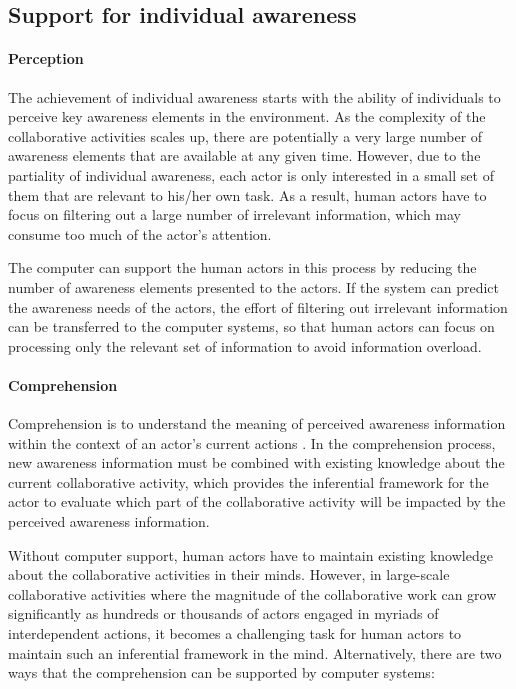 \subsection{Support for individual awareness} %
\label{sub:support_for_individual_awareness}
\paragraph*{Perception} %
\label{par:perception}
The achievement of individual awareness starts with the ability of individuals to perceive key awareness elements in the environment. As the complexity of the collaborative activities scales up, there are potentially a very large number of awareness elements that are available at any given time. However, due to the partiality of individual awareness, each actor is only interested in a small set of them that are relevant to his/her own task. As a result, human actors have to focus on filtering out a large number of irrelevant information, which may consume too much of the actor's attention. 

The computer can support the human actors in this process by reducing the number of awareness elements presented to the actors. If the system can predict the awareness needs of the actors, the effort of filtering out irrelevant information can be transferred to the computer systems, so that human actors can focus on processing only the relevant set of information to avoid information overload.

\paragraph*{Comprehension} %
\label{par:comprehension}
Comprehension is to understand the meaning of perceived awareness information within the context of an actor's current actions \cite{oulasvirta2007a}. In the comprehension process, new awareness information must be combined with existing knowledge about the current collaborative activity, which provides the inferential framework \cite{carroll2003a} for the actor to evaluate which part of the collaborative activity will be impacted by the perceived awareness information. 

Without computer support, human actors have to maintain existing knowledge about the collaborative activities in their minds. However, in large-scale collaborative activities where the magnitude of the collaborative work can grow significantly as hundreds or thousands of actors engaged in myriads of interdependent actions, it becomes a challenging task for human actors to maintain such an inferential framework in the mind. Alternatively, there are two ways that the comprehension can be supported by computer systems: 


